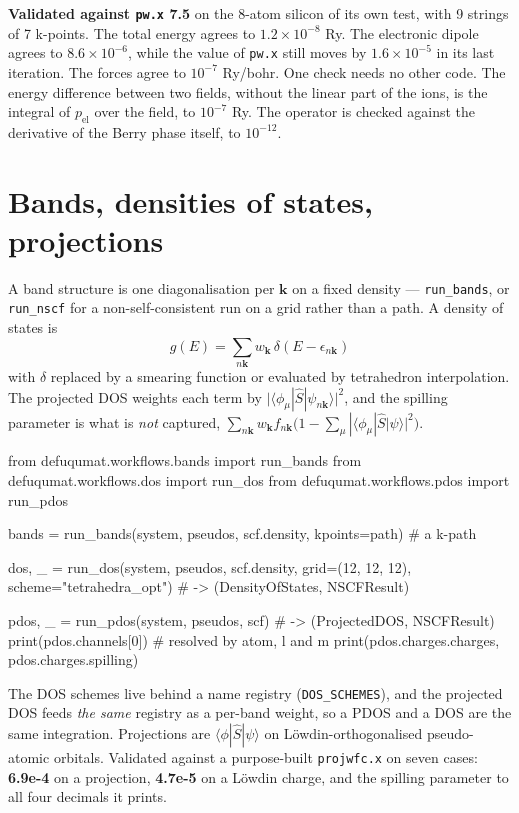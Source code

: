 \documentclass[11pt,a4paper]{article}
\newcommand{\code}[1]{\texttt{\small #1}}
\begin{document}
\textbf{Validated against \code{pw.x} 7.5} on the 8-atom silicon of its own test,
with 9 strings of 7 k-points. The total energy agrees to $1.2\times10^{-8}$ Ry. The
electronic dipole agrees to $8.6\times10^{-6}$, while the value of \code{pw.x} still
moves by $1.6\times10^{-5}$ in its last iteration. The forces agree to $10^{-7}$
Ry/bohr. One check needs no other code. The energy difference between two fields,
without the linear part of the ions, is the integral of $p_{\mathrm{el}}$ over the
field, to $10^{-7}$ Ry. The operator is checked against the derivative of the
Berry phase itself, to $10^{-12}$.

\section{Bands, densities of states, projections}

A band structure is one diagonalisation per $\mathbf k$ on a fixed density ---
\code{run\_bands}, or \code{run\_nscf} for a non-self-consistent run on a grid
rather than a path. A density of states is
\begin{equation*}
g(E) = \sum_{n\mathbf k} w_{\mathbf k}\,\delta(E - \epsilon_{n\mathbf k})
\end{equation*}
with $\delta$ replaced by a smearing function or evaluated by tetrahedron
interpolation. The projected DOS weights each term by
$\big|\langle\phi_\mu|\hat S|\psi_{n\mathbf k}\rangle\big|^2$, and the spilling
parameter is what is \emph{not} captured,
$\sum_{n\mathbf k} w_{\mathbf k} f_{n\mathbf k}\big(1-\sum_\mu|\langle\phi_\mu|\hat S|\psi\rangle|^2\big)$.

\begin{pycode}
from defuqumat.workflows.bands import run_bands
from defuqumat.workflows.dos import run_dos
from defuqumat.workflows.pdos import run_pdos

bands = run_bands(system, pseudos, scf.density, kpoints=path)   # a k-path

dos, _ = run_dos(system, pseudos, scf.density, grid=(12, 12, 12),
                 scheme="tetrahedra_opt")     # -> (DensityOfStates, NSCFResult)

pdos, _ = run_pdos(system, pseudos, scf)      # -> (ProjectedDOS, NSCFResult)
print(pdos.channels[0])                       # resolved by atom, l and m
print(pdos.charges.charges, pdos.charges.spilling)
\end{pycode}

The DOS schemes live behind a name registry (\code{DOS\_SCHEMES}), and the
projected DOS feeds \emph{the same} registry as a per-band weight, so a PDOS and
a DOS are the same integration. Projections are
$\langle\phi|\hat S|\psi\rangle$ on Löwdin-orthogonalised pseudo-atomic
orbitals. Validated against a purpose-built \code{projwfc.x} on seven cases:
\textbf{6.9e-4} on a projection, \textbf{4.7e-5} on a Löwdin charge, and the
spilling parameter to all four decimals it prints.
\end{document}
